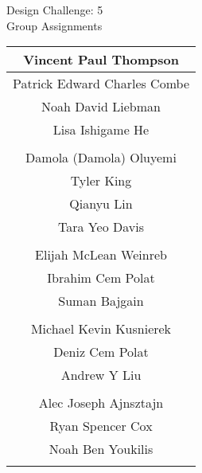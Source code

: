 \documentclass{article}
\begin{document}
\renewcommand{\arraystretch}{1.2} 
\begin{center}
{\Large Design Challenge: 5\\ 
Group Assignments} \\ 
\begin{tabular}{|c|} \hline 
Vincent Paul Thompson\\ \hline 
Patrick Edward Charles Combe\\ \hline 
Noah David Liebman\\ \hline 
Lisa Ishigame He\\ \hline 
\multicolumn{1}{c}{\vspace{1mm}} \\ 
\hline 
Damola (Damola) Oluyemi\\ \hline 
Tyler King\\ \hline 
Qianyu Lin\\ \hline 
Tara Yeo Davis\\ \hline 
\multicolumn{1}{c}{\vspace{1mm}} \\ 
\hline 
Elijah McLean Weinreb\\ \hline 
Ibrahim Cem Polat\\ \hline 
Suman Bajgain\\ \hline 
\multicolumn{1}{c}{\vspace{1mm}} \\ 
\hline 
Michael Kevin Kusnierek\\ \hline 
Deniz Cem Polat\\ \hline 
Andrew Y Liu\\ \hline 
\multicolumn{1}{c}{\vspace{1mm}} \\ 
\hline 
Alec Joseph Ajnsztajn\\ \hline 
Ryan Spencer Cox\\ \hline 
Noah Ben Youkilis\\ \hline 
\multicolumn{1}{c}{\vspace{1mm}} \\ 

\end{tabular} \\ 
\end{center}
\end{document}
